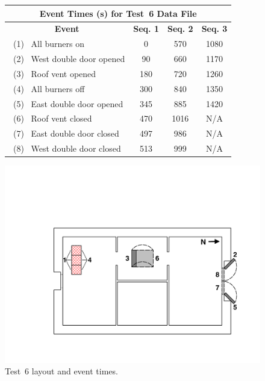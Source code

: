 \documentclass[12pt,oneside]{book}
\begin{document}
\begin{figure}[!ht]
\begin{minipage}[b]{0.8\columnwidth}
	\begin{flushleft}
	\begin{tabular}{lccc}
	\multicolumn{4}{c}{\normalsize Event Times (s) for Test~6 Data File} \\
	\toprule
	\multicolumn{1}{c}{\textbf{Event}} 	& \textbf{Seq. 1}	& \textbf{Seq. 2} 	& \textbf{Seq. 3} 	\\
	\midrule
	~(1)~ All burners on 				&	0				&	570				&	1080			\\
	~(2)~ West double door opened 		&	90				&   660				&	1170			\\
	~(3)~ Roof vent opened 		    	&	180				&	720 			& 	1260 			\\
	~(4)~ All burners off 				&	300				&   840				&	1350			\\
	~(5)~ East double door opened		&	345				&   885				&	1420			\\
	~(6)~ Roof vent closed 				&	470				&   1016			&	N/A				\\
	~(7)~ East double door closed		&	497 			&	986				&	N/A 			\\
	~(8)~  West double door closed		&	513 			&	999				&	N/A				\\
	\bottomrule
	\end{tabular}
	\end{flushleft}
\end{minipage}
\begin{minipage}[b]{0.86\columnwidth}
	\vspace{15pt}
	\centering
	\includegraphics[width=\columnwidth]{../Figures/Floor_Plans/East_Structure_Test_6}
\end{minipage}
\caption{Test~6 layout and event times.}
\label{fig:east_test_6}
\end{figure}
\clearpage
\end{document}
